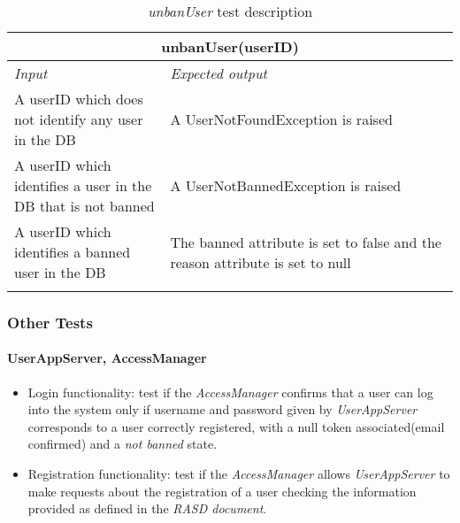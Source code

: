 \begin{longtable}{p{0.35\linewidth}p{0.65\linewidth}}
\multicolumn{2}{c}{\textbf{unbanUser(userID)}} \\
\toprule
\emph{Input} & \emph{Expected output} \\
\midrule
A userID which does not identify any user in the DB & A UserNotFoundException is raised\\
\midrule
A userID which identifies a user in the DB that is not banned & A UserNotBannedException is raised\\
\midrule
A userID which identifies a banned user in the DB & The banned attribute is set to false and the reason attribute is set to null \\
\bottomrule
\caption{\emph{unbanUser} test description}
\end{longtable}


\subsubsection{Other Tests}

\paragraph{UserAppServer, AccessManager}
\begin{itemize}
\item Login functionality: test if the \emph{AccessManager} confirms that a user can log into the system only if username and password given by \emph{UserAppServer} corresponds to a user correctly registered, with a null token associated(email confirmed) and a \emph{not banned} state.
\item Registration functionality: test if the \emph{AccessManager} allows \emph{UserAppServer} to make requests about the registration of a user checking the information provided as defined in the \emph{RASD document}\cite{RASD}.
\end{itemize}



